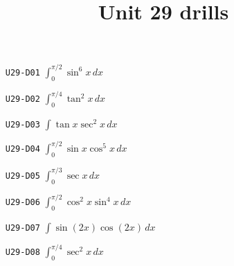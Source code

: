 \title{Unit 29 drills}\maketitle\begin{enumerate}
  \item[\texttt{U29-D01}] $\displaystyle \int_{0}^{\pi/2}\sin^{6}x\,dx$
  \item[\texttt{U29-D02}] $\displaystyle \int_{0}^{\pi/4}\tan^{2}x\,dx$
  \item[\texttt{U29-D03}] $\displaystyle \int\tan x\sec^{2}x\,dx$
  \item[\texttt{U29-D04}] $\displaystyle \int_{0}^{\pi/2}\sin x\cos^{5}x\,dx$
  \item[\texttt{U29-D05}] $\displaystyle \int_{0}^{\pi/3}\sec x\,dx$
  \item[\texttt{U29-D06}] $\displaystyle \int_{0}^{\pi/2}\cos^{2}x\sin^{4}x\,dx$
  \item[\texttt{U29-D07}] $\displaystyle \int\sin(2x)\cos(2x)\,dx$
  \item[\texttt{U29-D08}] $\displaystyle \int_{0}^{\pi/4}\sec^{2}x\,dx$
\end{enumerate}
